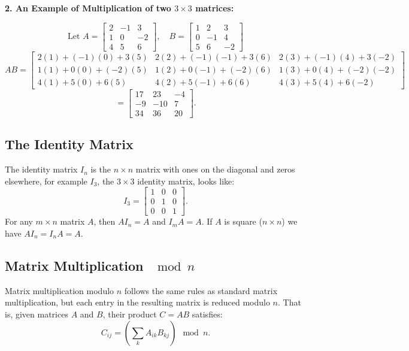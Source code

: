 \newpage 
\noindent \textbf{2. An Example of Multiplication of two \( 3 \times 3 \) matrices:}

\[
    \text{Let } A = \begin{bmatrix} 2 & -1 & 3 \\ 1 & 0 & -2 \\ 4 & 5 & 6 \end{bmatrix}, \quad
B = \begin{bmatrix} 1 & 2 & 3 \\ 0 & -1 & 4 \\ 5 & 6 & -2 \end{bmatrix}
\]
\[
AB = \begin{bmatrix} 
2(1) + (-1)(0) + 3(5) & 2(2) + (-1)(-1) + 3(6) & 2(3) + (-1)(4) + 3(-2) \\ 
1(1) + 0(0) + (-2)(5) & 1(2) + 0(-1) + (-2)(6) & 1(3) + 0(4) + (-2)(-2) \\ 
4(1) + 5(0) + 6(5) & 4(2) + 5(-1) + 6(6) & 4(3) + 5(4) + 6(-2)
\end{bmatrix}
\]
\[
= \begin{bmatrix} 17 & 23 & -4 \\ -9 & -10 & 7 \\ 34 & 36 & 20 \end{bmatrix}.
\]

\subsection{The Identity Matrix}

The identity matrix \( I_n \) is the \( n \times n \) matrix with ones on the diagonal and zeros elsewhere, for example $I_3$, the $3\times 3$ identity matrix, looks like:
\[
I_3 = \begin{bmatrix} 1 & 0 & 0 \\ 0 & 1 & 0 \\ 0 & 0 & 1 \end{bmatrix}.
\]
For any $m \times n$ matrix \( A \), then \( A I_n = A \) and \( I_m A = A \). If $A$ is square ($n\times n$) we have $AI_n =I_nA = A$.

\subsection{Matrix Multiplication \(\mod n \)}

Matrix multiplication modulo \( n \) follows the same rules as standard matrix multiplication, but each entry in the resulting matrix is reduced modulo \( n \). That is, given matrices \( A \) and \( B \), their product \( C = AB \) satisfies:
\[
C_{ij} = \left( \sum_{k} A_{ik} B_{kj} \right) \mod n.
\]

